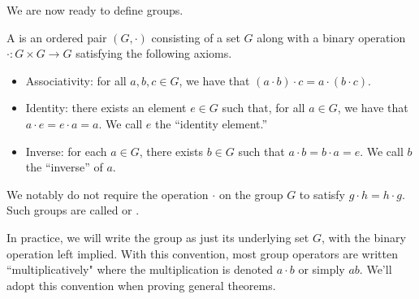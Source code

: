 \documentclass[../main.tex]{subfiles}
\begin{document}
We are now ready to define groups.
\begin{definition} \label{defi:group}
    A  is an ordered pair $(G,\cdot)$ consisting of a set $G$ along with a binary operation $\cdot\colon G \times G \to G$ satisfying the following axioms.
    \begin{itemize}
        \item Associativity: for all $a,b,c \in G$, we have that $(a \cdot b) \cdot c = a \cdot (b \cdot c)$.
        \item Identity: there exists an element $e \in G$ such that, for all $a \in G$, we have that $a \cdot e = e \cdot a = a$. We call $e$ the ``identity element.''
        \item Inverse: for each $a \in G$, there exists $b\in G$ such that $a \cdot b=b \cdot a = e$. We call $b$ the ``inverse'' of $a$.
    \end{itemize}
    We notably do not require the operation $\cdot$ on the group $G$ to satisfy $g\cdot h=h\cdot g$. Such groups are called  or .
\end{definition}
In practice, we will write the group as just its underlying set $G$, with the binary operation left implied. With this convention, most group operators are written ``multiplicatively" where the multiplication is denoted $a \cdot b$ or simply $ab$. We'll adopt this convention when proving general theorems.
\end{document}
